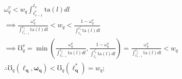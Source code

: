 \documentclass[hidelinks, nonatbib]{elsarticle}
\begin{document}
\begin{align}
    &
    \omega_{q}^{v} < 
    w_q
    \int_{
        \ell_{v-1}^{*}
    }^{
        \ell_{v}
    }{
        \text{ta}(l)dl
    }
    \\
    &\implies
    \frac{
        \omega_{q}^{v}
    }{
        \int_{
            \ell_{v-1}^{*}
        }^{
            \ell_{v}
        }
        \text{ta}(l)dl
    }
    < 
    w_q
    <
    \frac{
        1-\omega_{q}^{v}
    }{
        \int_{
            \ell_{v}
        }^{
            \ell_{v}^{*}
        }
        \text{ta}(l)dl
    }
    \\
    &\implies
    \mho_{q}^{v} = 
    \min\left(
        \frac{
            \omega_{q}^{v}
        }{
            \int_{
                \ell_{v-1}^{*}
            }^{
                \ell_{v}
            }
            \text{ta}(l)dl
        }
        ,
        \frac{
            1-\omega_{q}^{v}
        }{
            \int_{
                \ell_{v}
            }^{
                \ell_{v}^{*}
            }
            \text{ta}(l)dl
        }
    \right)
    =
    \frac{
        \omega_{q}^{v}
    }{
        \int_{
            \ell_{v-1}^{*}
        }^{
            \ell_{v}
        }
        \text{ta}(l)dl
    }
    <
    w_q
    \\
    &\therefore
    \mho_{q}(
        \boldsymbol{\ell_q}
        ,\boldsymbol{\omega_q}
    ) 
    <
    \mho_{q}(
        \boldsymbol{\ell_{q}^{*}}
    )
    =
    w_q
    ;
\end{align}
\end{document}
